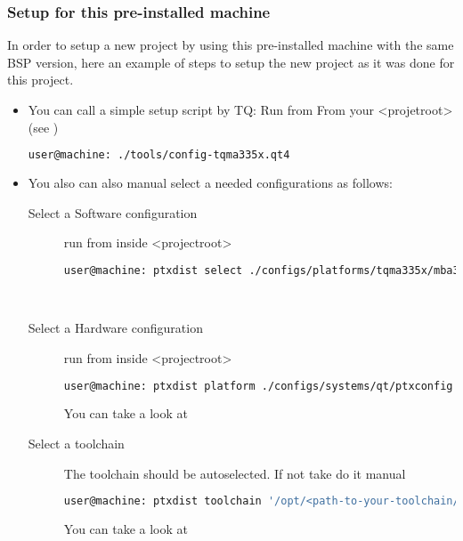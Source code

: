 \subsubsection{Setup for this pre-installed machine }%
In order to setup a new project by using this pre-installed machine with the
same BSP version, here an example of steps to setup the new project as it was
done for this project.

\begin{itemize}
    \item You can call a simple setup script by TQ:\@
        Run from From your <projetroot> (see )
        \begin{lstlisting}[language=bash, gobble=12,caption={Run TQ-Systems
        enviroment setup script}]
                user@machine: ./tools/config-tqma335x.qt4
        \end{lstlisting}

    \item You also can also manual select a needed configurations as follows:

        \begin{description}
            \item[Select a Software configuration] run from inside <projectroot>

                \begin{lstlisting}[language=bash,gobble=12, caption={Select the
                ptxdist configuraion file},keywordstyle=\color{black}]
            user@machine: ptxdist select ./configs/platforms/tqma335x/mba335x/platformconfig
                \end{lstlisting}~\cite[Selecting a Userland
                Configuration]{ptxdist_manual}

            \item[Select a Hardware configuration] run from inside <projectroot>

                \begin{lstlisting}[language=bash,gobble=12, caption={Select the
                ptxdist configuration file.}]
            user@machine: ptxdist platform ./configs/systems/qt/ptxconfig
                \end{lstlisting}
                You can take a look at~\cite[Selecting
                a Hardware Platform]{ptxdist_manual}
            \item[Select a toolchain]
                The toolchain should be autoselected. If not take do it
                manual
                \begin{lstlisting}[language=bash,gobble=12,caption={Select the
                cross compiler toolchain}]
            user@machine: ptxdist toolchain '/opt/<path-to-your-toolchain/bin'
                \end{lstlisting}
                You can take a look at~\cite[Selecting a Toolchain]
                {ptxdist_manual}
        \end{description}



\end{itemize}
